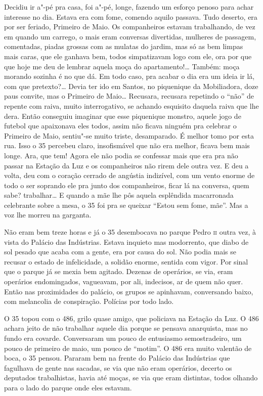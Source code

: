 Decidiu ir a"-pé pra casa, foi a"-pé, longe, fazendo um esforço penoso
para achar interesse no dia. Estava era com fome, comendo aquilo
passava. Tudo deserto, era por ser feriado, Primeiro de Maio. Os
companheiros estavam trabalhando, de vez em quando um carrego, o mais
eram conversas divertidas, mulheres de passagem, comentadas, piadas
grossas com as mulatas do jardim, mas só as bem limpas mais caras, que
ele ganhava bem, todos simpatizavam logo com ele, ora por que que hoje
me deu de lembrar aquela moça do apartamento!\ldots{} Também: moça morando
sozinha é no que dá. Em todo caso, pra acabar o dia era um ideia ir lá,
com que pretexto?\ldots{} Devia ter ido em Santos, no piquenique da
Mobiliadora, doze paus convite, mas o Primeiro de Maio\ldots{} Recusara,
recusara repetindo o ``não'' de repente com raiva, muito interrogativo,
se achando esquisito daquela raiva que lhe dera. Então conseguiu
imaginar que esse piquenique monstro, aquele jogo de futebol que
apaixonava eles todos, assim não ficava ninguém pra celebrar o Primeiro
de Maio, sentiu"-se muito triste, desamparado. É melhor tomo por esta
rua. Isso o 35 percebeu claro, insofismável que não era melhor, ficava
bem mais longe. Ara, que tem! Agora ele não podia se confessar mais que
era pra não passar na Estação da Luz e os companheiros não rirem dele
outra vez. E deu a volta, deu com o coração cerrado de angústia
indizível, com um vento enorme de todo o ser soprando ele pra junto dos
companheiros, ficar lá na conversa, quem sabe? trabalhar\ldots{} E quando a
mãe lhe pôs aquela esplêndida macarronada celebrante sobre a mesa, o 35
foi pra se queixar ``Estou sem fome, mãe''. Mas a voz lhe morreu na
garganta.

Não eram bem treze horas e já o 35 desembocava no parque Pedro \textsc{ii} outra
vez, à vista do Palácio das Indústrias. Estava inquieto mas modorrento,
que diabo de sol pesado que acaba com a gente, era por causa do sol. Não
podia mais se recusar o estado de infelicidade, a solidão enorme,
sentida com vigor. Por sinal que o parque já se mexia bem agitado.
Dezenas de operários, se via, eram operários endomingados, vagueavam,
por ali, indecisos, ar de quem não quer. Então nas proximidades do
palácio, os grupos se apinhavam, conversando baixo, com melancolia de
conspiração. Polícias por todo lado.

O 35 topou com o 486, grilo quase amigo, que policiava na Estação da
Luz. O 486 achara jeito de não trabalhar aquele dia porque se pensava
anarquista, mas no fundo era covarde. Conversaram um pouco de entusiasmo
semostradeiro, um pouco de primeiro de maio, um pouco de ``motim''. O
486 era muito valentão de boca, o 35 pensou. Pararam bem na frente do
Palácio das Indústrias que fagulhava de gente nas sacadas, se via que
não eram operários, decerto os deputados trabalhistas, havia até moças,
se via que eram distintas, todos olhando para o lado do parque onde eles
estavam.

